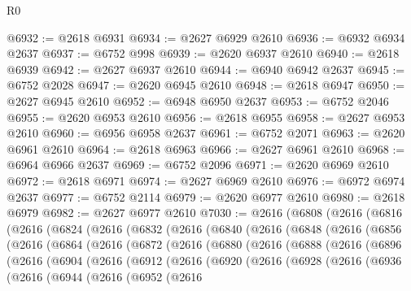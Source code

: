\begin{lexlean}{R0}
\begin{coremodule}
@6932 := @2618 @6931
@6934 := @2627 @6929 @2610
@6936 := @6932 @6934 @2637
@6937 := @6752 @998
@6939 := @2620 @6937 @2610
@6940 := @2618 @6939
@6942 := @2627 @6937 @2610
@6944 := @6940 @6942 @2637
@6945 := @6752 @2028
@6947 := @2620 @6945 @2610
@6948 := @2618 @6947
@6950 := @2627 @6945 @2610
@6952 := @6948 @6950 @2637
@6953 := @6752 @2046
@6955 := @2620 @6953 @2610
@6956 := @2618 @6955
@6958 := @2627 @6953 @2610
@6960 := @6956 @6958 @2637
@6961 := @6752 @2071
@6963 := @2620 @6961 @2610
@6964 := @2618 @6963
@6966 := @2627 @6961 @2610
@6968 := @6964 @6966 @2637
@6969 := @6752 @2096
@6971 := @2620 @6969 @2610
@6972 := @2618 @6971
@6974 := @2627 @6969 @2610
@6976 := @6972 @6974 @2637
@6977 := @6752 @2114
@6979 := @2620 @6977 @2610
@6980 := @2618 @6979
@6982 := @2627 @6977 @2610
@7030 := @2616
    (@6808
      (@2616
        (@6816
          (@2616
            (@6824
              (@2616
                (@6832
                  (@2616
                    (@6840
                      (@2616
                        (@6848
                          (@2616
                            (@6856
                              (@2616
                                (@6864
                                  (@2616
                                    (@6872
                                      (@2616
                                        (@6880
                                          (@2616
                                            (@6888
                                              (@2616
                                                (@6896
                                                  (@2616
                                                    (@6904
                                                      (@2616
                                                        (@6912
                                                          (@2616
                                                            (@6920
                                                              (@2616
                                                                (@6928
                                                                  (@2616
                                                                    (@6936
                                                                      (@2616
                                                                        (@6944
                                                                          (@2616
                                                                            (@6952
                                                                              (@2616

\end{coremodule}
\end{lexlean}
